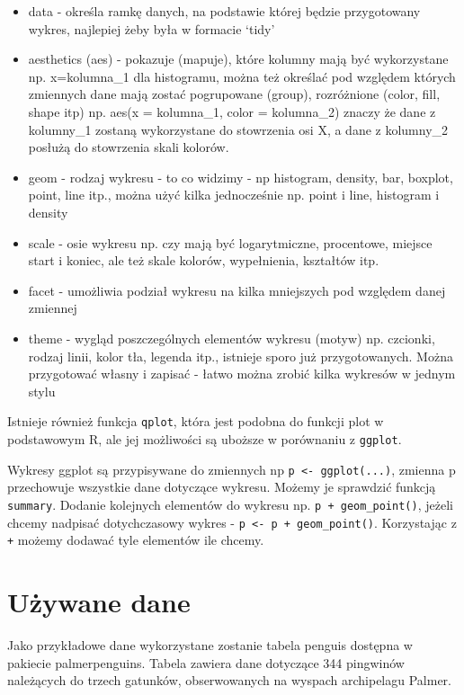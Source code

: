 \documentclass[
]{book}
\begin{document}
\begin{itemize}
\item
  data - określa ramkę danych, na podstawie której będzie przygotowany wykres, najlepiej żeby była w formacie `tidy'
\item
  aesthetics (aes) - pokazuje (mapuje), które kolumny mają być wykorzystane np. x=kolumna\_1 dla histogramu, można też określać pod względem których zmiennych dane mają zostać pogrupowane (group), rozróżnione (color, fill, shape itp) np. aes(x = kolumna\_1, color = kolumna\_2) znaczy że dane z kolumny\_1 zostaną wykorzystane do stowrzenia osi X, a dane z kolumny\_2 posłużą do stowrzenia skali kolorów.
\item
  geom - rodzaj wykresu - to co widzimy - np histogram, density, bar, boxplot, point, line itp., można użyć kilka jednocześnie np. point i line, histogram i density
\item
  scale - osie wykresu np. czy mają być logarytmiczne, procentowe, miejsce start i koniec, ale też skale kolorów, wypełnienia, kształtów itp.
\item
  facet - umożliwia podział wykresu na kilka mniejszych pod względem danej zmiennej
\item
  theme - wygląd poszczególnych elementów wykresu (motyw) np. czcionki, rodzaj linii, kolor tła, legenda itp., istnieje sporo już przygotowanych. Można przygotować własny i zapisać - łatwo można zrobić kilka wykresów w jednym stylu
\end{itemize}

Istnieje również funkcja \texttt{qplot}, która jest podobna do funkcji plot w podstawowym R, ale jej możliwości są uboższe w porównaniu z \texttt{ggplot}.

Wykresy ggplot są przypisywane do zmiennych np \texttt{p\ \textless{}-\ ggplot(...)}, zmienna p przechowuje wszystkie dane dotyczące wykresu. Możemy je sprawdzić funkcją \texttt{summary}. Dodanie kolejnych elementów do wykresu np. \texttt{p\ +\ geom\_point()}, jeżeli chcemy nadpisać dotychczasowy wykres - \texttt{p\ \textless{}-\ p\ +\ geom\_point()}. Korzystając z \texttt{+} możemy dodawać tyle elementów ile chcemy.

\hypertarget{uux17cywane-dane}{%
\section{Używane dane}\label{uux17cywane-dane}}

Jako przykładowe dane wykorzystane zostanie tabela penguis dostępna w pakiecie palmerpenguins. Tabela zawiera dane dotyczące 344 pingwinów należących do trzech gatunków, obserwowanych na wyspach archipelagu Palmer.
\end{document}
